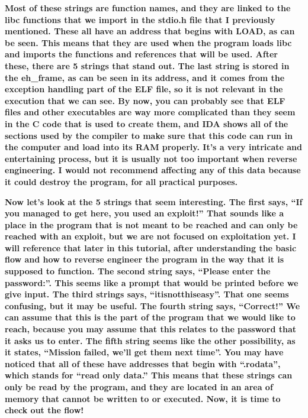 \documentclass[letterpaper]{article}
\newcommand{\sitfig}[3]{
\begin{figure}[H]
\centering
\makebox[\textwidth][c]{
#2
}
\label{#1}
\end{figure}
}
\newcommand{\sitgfx}[4][scale=1.0]{
\sitfig{#3}{\texttt{[image: \#2]}}{#4}
}
\begin{document}
  
\sitgfx[width=6.1252in,height=3.8335in]{reversing-img046.png}{fig:unk}{TODO CAPTION}
 \textbf{Most of these strings are function names, and they are linked to the libc functions that we import in the
stdio.h file that I previously mentioned. These all have an address that begins with LOAD, as can be seen. This means
that they are used when the program loads libc and imports the functions and references that will be used. After these,
there are 5 strings that stand out. The last string is stored in the eh\_frame, as can be seen in its address, and it
comes from the exception handling part of the ELF file, so it is not relevant in the execution that we can see. By now,
you can probably see that ELF files and other executables are way more complicated than they seem in the C code that is
used to create them, and IDA shows all of the sections used by the compiler to make sure that this code can run in the
computer and load into its RAM properly. It's a very intricate and entertaining process, but it is usually not too
important when reverse engineering. I would not recommend affecting any of this data because it could destroy the
program, for all practical purposes.}

\textbf{Now let's look at the 5 strings that seem interesting. The first says, ``If you managed to get here, you used an
exploit!'' That sounds like a place in the program that is not meant to be reached and can only be reached with an
exploit, but we are not focused on exploitation yet. I will reference that later in this tutorial, after understanding
the basic flow and how to reverse engineer the program in the way that it is supposed to function. The second string
says, ``Please enter the password:''. This seems like a prompt that would be printed before we give input. The third
strings says, ``itisnotthiseasy''. That one seems confusing, but it may be useful. The fourth string says, ``Correct!''
We can assume that this is the part of the program that we would like to reach, because you may assume that this
relates to the password that it asks us to enter. The fifth string seems like the other possibility, as it states,
``Mission failed, we'll get them next time''. You may have noticed that all of these have addresses that begin with
``.rodata'', which stands for ``read only data.'' This means that these strings can only be read by the program, and
they are located in an area of memory that cannot be written to or executed. Now, it is time to check out the flow!}
\end{document}
